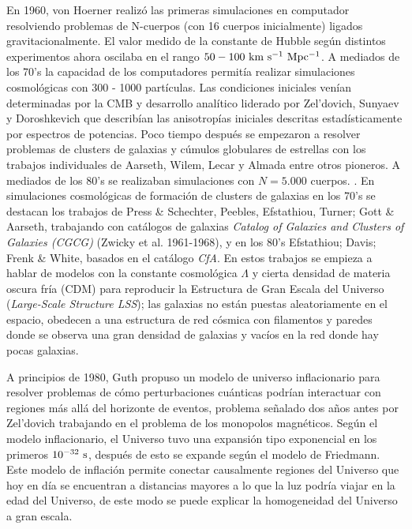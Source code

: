 \documentclass[preprint]{aastex62}
\begin{document}
  
  En 1960, von Hoerner realizó las primeras simulaciones en computador resolviendo problemas
  de N-cuerpos (con 16 cuerpos inicialmente) ligados gravitacionalmente. El valor medido de
  la constante de Hubble según distintos experimentos ahora oscilaba en el rango
  $50-100 \rm~km~s^{-1}~Mpc^{-1}$.  
  A mediados de los 70's la capacidad de los computadores permitía realizar simulaciones
  cosmológicas con 300 - 1000 partículas. Las condiciones iniciales venían determinadas por
  la CMB y desarrollo analítico liderado por Zel'dovich, Sunyaev y Doroshkevich
  que describían las anisotropías iniciales descritas estadísticamente por espectros de
  potencias. Poco tiempo después se empezaron a resolver problemas de clusters de galaxias
  y cúmulos globulares de estrellas
  con los trabajos individuales de Aarseth, Wilem, Lecar y Almada entre otros pioneros. A
  mediados de los 80's se realizaban simulaciones con $N = 5.000$ cuerpos.
  \citep{Aarseth2003, Press&Schechter1974}.
  En simulaciones cosmológicas de formación de clusters de galaxias en los 70's
  se destacan los trabajos de Press \& Schechter, Peebles, Efstathiou, Turner; Gott \& Aarseth,
  trabajando con catálogos de galaxias \textit{Catalog of Galaxies and Clusters of Galaxies
    (CGCG)} (Zwicky et al. 1961-1968), y en los 80's Efstathiou; Davis; Frenk \& White, basados
  en el catálogo \textit{CfA}. En estos trabajos se empieza a hablar de modelos con la
  constante cosmológica $\Lambda$ y cierta densidad de materia oscura fría (CDM) para reproducir
  la Estructura de Gran Escala del Universo  (\textit{Large-Scale
    Structure LSS}); las galaxias no están puestas aleatoriamente en el espacio, obedecen
  a una estructura de red cósmica con filamentos y paredes donde se observa una gran
  densidad de galaxias y vacíos en la red donde hay pocas galaxias. 

  A principios de 1980, Guth propuso un modelo de universo inflacionario para resolver
  problemas de cómo perturbaciones cuánticas podrían interactuar con regiones más allá
  del horizonte de eventos, problema señalado dos años antes por Zel'dovich trabajando
  en el problema de los monopolos magnéticos. Según el modelo inflacionario, el Universo
  tuvo una expansión tipo exponencial en los primeros $10 ^{-32} \rm~s$, después de esto
  se expande según el modelo de Friedmann. 
  Este modelo de inflación permite conectar causalmente regiones del Universo  que hoy
  en día se encuentran a distancias mayores a lo que la luz podría viajar en la edad del
  Universo, de este modo se puede explicar la homogeneidad del Universo a gran escala.
  
\end{document}
